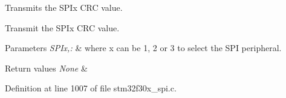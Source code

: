 Transmits the S\-P\-Ix C\-R\-C value. 

Transmit the S\-P\-Ix C\-R\-C value.


\begin{DoxyParams}{Parameters}
{\em S\-P\-Ix,\-:} & where x can be 1, 2 or 3 to select the S\-P\-I peripheral. \\
\hline
\end{DoxyParams}

\begin{DoxyRetVals}{Return values}
{\em None} & \\
\hline
\end{DoxyRetVals}


Definition at line 1007 of file stm32f30x\-\_\-spi.\-c.

